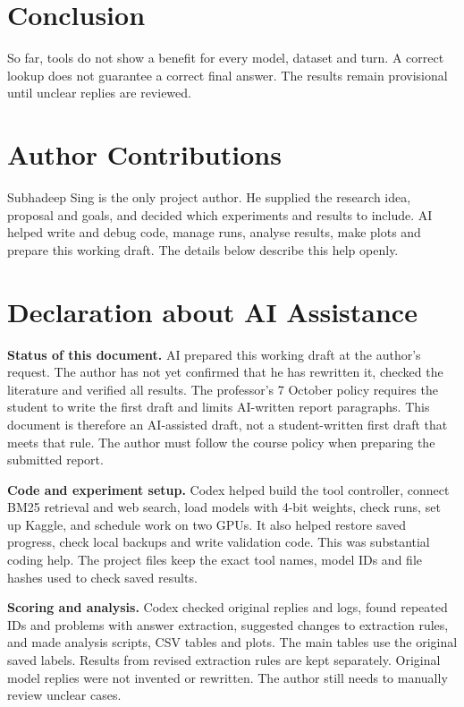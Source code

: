 \documentclass{article}
\begin{document}
\section{Conclusion}
So far, tools do not show a benefit for every model, dataset and turn. A correct lookup does not guarantee a correct final answer. The results remain provisional until unclear replies are reviewed.
\label{lastmainpage}

\clearpage



\clearpage
\section*{Author Contributions}
Subhadeep Sing is the only project author. He supplied the research idea, proposal and goals, and decided which experiments and results to include. AI helped write and debug code, manage runs, analyse results, make plots and prepare this working draft. The details below describe this help openly.

\section*{Declaration about AI Assistance}
\textbf{Status of this document.} AI prepared this working draft at the author's request. The author has not yet confirmed that he has rewritten it, checked the literature and verified all results. The professor's 7 October policy requires the student to write the first draft and limits AI-written report paragraphs. This document is therefore an AI-assisted draft, not a student-written first draft that meets that rule. The author must follow the course policy when preparing the submitted report.

\textbf{Code and experiment setup.} Codex helped build the tool controller, connect BM25 retrieval and web search, load models with 4-bit weights, check runs, set up Kaggle, and schedule work on two GPUs. It also helped restore saved progress, check local backups and write validation code. This was substantial coding help. The project files keep the exact tool names, model IDs and file hashes used to check saved results.

\textbf{Scoring and analysis.} Codex checked original replies and logs, found repeated IDs and problems with answer extraction, suggested changes to extraction rules, and made analysis scripts, CSV tables and plots. The main tables use the original saved labels. Results from revised extraction rules are kept separately. Original model replies were not invented or rewritten. The author still needs to manually review unclear cases.
\end{document}
